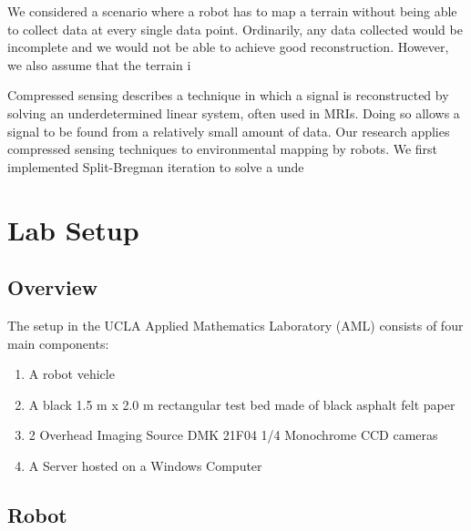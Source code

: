 \documentclass[english]{article}\usepackage[]{graphicx}\usepackage[]{color}
\begin{document}
We considered a scenario where a robot has to map a terrain without being able to collect data at every single data point. Ordinarily, any data collected would be incomplete and we would not be able to achieve good reconstruction. However, we also assume that the terrain i


Compressed sensing describes a technique in which a signal is reconstructed by solving an underdetermined linear system, often used in MRIs. Doing so allows a signal to be found from a relatively small amount of data. Our research applies compressed sensing techniques to environmental mapping by robots. We first implemented Split-Bregman iteration to solve a unde



\section{Lab Setup}
\subsection{Overview}
The setup in the UCLA Applied Mathematics Laboratory (AML) consists of four main components: 

\begin{enumerate}
\item A robot vehicle 
\item A black 1.5 m x 2.0 m rectangular test bed made of black asphalt felt paper
\item 2 Overhead Imaging Source DMK 21F04 1/4 Monochrome CCD cameras
\item A Server hosted on a Windows Computer
\end{enumerate}

\subsection{Robot}
\end{document}
